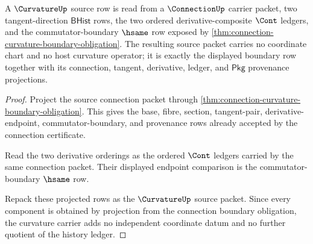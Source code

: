 \begin{theorem}
\label{thm:curvature-boundary-source-obligation}
A $\CurvatureUp$ source row is read from a $\ConnectionUp$ carrier packet, two tangent-direction $\mathsf{BHist}$ rows, the two ordered derivative-composite $\Cont$ ledgers, and the commutator-boundary $\hsame$ row exposed by \autoref{thm:connection-curvature-boundary-obligation}. The resulting source packet carries no coordinate chart and no host curvature operator; it is exactly the displayed boundary row together with its connection, tangent, derivative, ledger, and $\mathsf{Pkg}$ provenance projections.
\end{theorem}
\begin{proof}
Project the source connection packet through \autoref{thm:connection-curvature-boundary-obligation}. This gives the base, fibre, section, tangent-pair, derivative-endpoint, commutator-boundary, and provenance rows already accepted by the connection certificate.

Read the two derivative orderings as the ordered $\Cont$ ledgers carried by the same connection packet. Their displayed endpoint comparison is the commutator-boundary $\hsame$ row.

Repack these projected rows as the $\CurvatureUp$ source packet. Since every component is obtained by projection from the connection boundary obligation, the curvature carrier adds no independent coordinate datum and no further quotient of the history ledger.
\end{proof}

